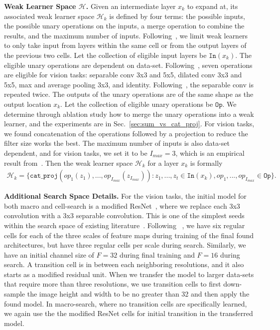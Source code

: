 \textbf{Weak Learner Space $\mathcal{H}$.}
Given an intermediate layer $x_{k}$ to expand at, its associated weak learner space $\mathcal{H}_{k}$ is defined by four terms: the possible inputs, the
possible unary operations on the inputs, a merge operation to combine the results, and the maximum number of inputs. 
Following~\citep{NASCell,Real2018RegularizedEF,Liu2018DARTSDA}, we limit weak learners to only take input from layers within the same cell or from the output layers of the previous 
two cells. Let the collection of eligible input layers be $\texttt{In}(x_{k})$. 
The eligible unary operations are dependent on data-set. Following~\citep{Liu2018DARTSDA}, seven operations are eligible for vision tasks:  
separable conv 3x3 and 5x5, dilated conv 3x3 and 5x5, max and average pooling 3x3, and identity. Following~\citep{NASCell,Real2018RegularizedEF}, the separable conv is 
repeated twice. The outputs of the unary operations are of the same shape 
as the output location $x_k$. 
Let the collection of eligible unary operations be $\texttt{Op}$.
We determine through ablation study how to merge the unary operations into a weak learner, and the experiments are in Sec.~\ref{sec:sum_vs_cat_proj}. For vision tasks, we found 
concatenation of the operations followed by a projection to reduce the filter size works the best. 
The maximum number of inputs is also data-set dependent, and for vision tasks, we set it to be $I_{max} = 3$, which is an empirical result from~\citep{darts_gumbel}. 
Then the weak learner space $\mathcal{H}_{k}$ for a layer $x_{k}$ is formally 
\begin{align}
\mathcal{H}_{k} = \{ \texttt{cat\_proj}( op_1(z_1), ..., op_{I_{max}}(z_{I_{max}})) : z_1, ..., z_t \in \texttt{In}(x_{k}), op_1, ..., op_{I_{max}} \in \texttt{Op}  \}.
\end{align}



\textbf{Additional Search Space Details.}
For the vision tasks, the initial model for both macro and cell-search is a modified ResNet~\citep{resnet}, where we replace each 3x3 convolution with a 3x3 separable convolution. This is one of the simplest seeds within the search space of existing literature~\citep{NASCell,Pham2018EfficientNA,Liu2018DARTSDA}.  Following ~\citep{NASCell}, we have six regular cells for each of the three scales of feature maps during training of the final found architectures, 
but have three regular cells per scale during search. Similarly, we have an initial channel size of $F=32$ during final training and $F=16$ during search. 
A transition cell is in between each neighboring resolutions, and it also starts as a modified residual unit. 
When we transfer the model to larger data-sets that require more than three resolutions, we use transition cells to first down-sample the image height and width to be no greater than 32 and then apply the found model. In macro-search, where no transition cells are specifically learned, we again use the the modified ResNet cells for initial transition in the transferred model.


